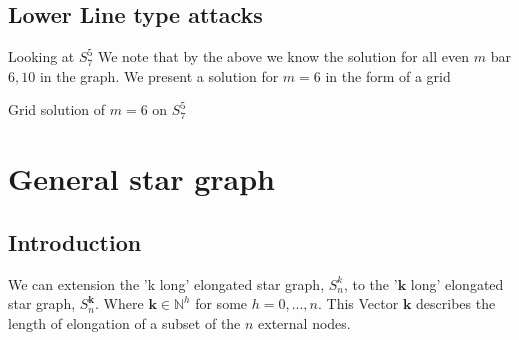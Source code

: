 \documentclass[a4paper,10pt]{article}
\theoremstyle{definition}
\theoremstyle{definition}
\theoremstyle{remark}
\theoremstyle{definition}
\begin{document}
\subsection{Lower Line type attacks}
Looking at $S_{7}^{5}$
We note that by the above we know the solution for all even $m$ bar $6,10$ in the graph. We present a solution for $m=6$ in the form of a grid

\begin{myfigure}
\begin{center}
\end{center}
\caption{Grid solution of $m=6$ on $S_{7}^{5}$}
\end{myfigure}


\section{General star graph}

\subsection{Introduction}
We can extension the 'k long' elongated star graph, $S_{n}^k$, to the '$\bm{k}$ long' elongated star graph, $S^{\bm{k}}_{n}$. Where $\bm{k} \in \mathbb{N}^{h}$ for some $h=0,...,n$. This Vector $\bm{k}$ describes the length of elongation of a subset of the $n$ external nodes.
\end{document}
